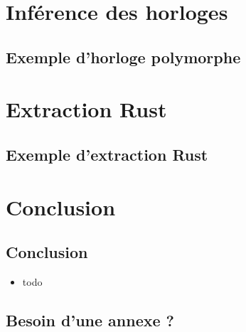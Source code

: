 \documentclass[11pt,usenames,dvipsnames]{beamer}
\begin{document}
\section{Inférence des horloges}
\subsection{Exemple d'horloge polymorphe}
\begin{frame}[fragile]{\null}
  
\end{frame}


\section{Extraction Rust}
\subsection{Exemple d'extraction Rust}

\section{Conclusion}
\subsection{Conclusion}
\begin{frame}{\null}
  \begin{itemize}
  \item todo
  \end{itemize}
\end{frame}

\appendix
\subsection{Besoin d'une annexe ?}
\begin{frame}{\null}
\end{frame}
\end{document}
